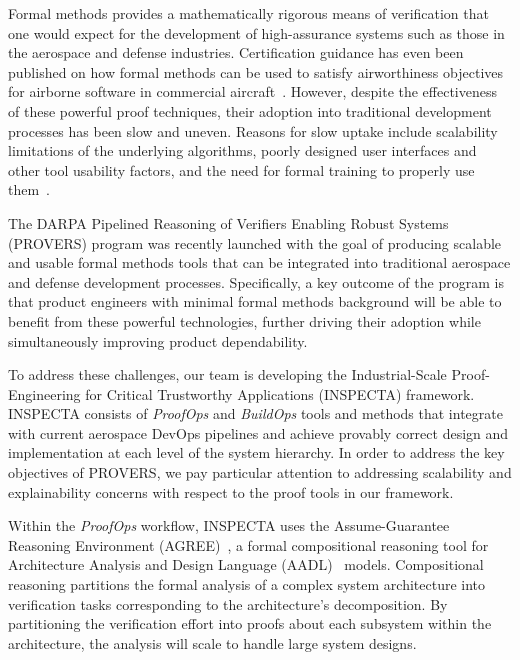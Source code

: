Formal methods provides a mathematically rigorous means of verification that one would expect for the development of high-assurance systems such as those in the aerospace and defense industries. Certification guidance has even been published on how formal methods can be used to satisfy airworthiness objectives for airborne software in commercial aircraft~\cite{DO-333}.  However, despite the effectiveness of these powerful proof techniques, their adoption into traditional development processes has been slow and uneven.  Reasons for slow uptake include scalability limitations of the underlying algorithms, poorly designed user interfaces and other tool usability factors, and the need for formal training to properly use them~\cite{davis-fmics13}.

The DARPA Pipelined Reasoning of Verifiers Enabling Robust Systems (PROVERS) program was recently launched with the goal of producing scalable and usable formal methods tools that can be integrated into traditional aerospace and defense development processes.  Specifically, a key outcome of the program is that product engineers with minimal formal methods background will be able to benefit from these powerful technologies, further driving their adoption while simultaneously improving product dependability.

To address these challenges, our team is developing the Industrial-Scale Proof-Engineering for Critical Trustworthy Applications (INSPECTA) framework.  INSPECTA consists of \textit{ProofOps} and \textit{BuildOps} tools and methods that integrate with current aerospace DevOps pipelines and achieve provably correct design and implementation at each level of the system hierarchy.  In order to address the key objectives of PROVERS, we pay particular attention to addressing scalability and explainability concerns with respect to the proof tools in our framework.

Within the \textit{ProofOps} workflow, INSPECTA uses the Assume-Guarantee Reasoning Environment (AGREE)~\cite{compositional-analysis-agree}, a formal compositional reasoning tool for Architecture Analysis and Design Language (AADL)~\cite{feiler-aadl} models.
Compositional reasoning partitions the formal analysis of a complex system architecture into verification tasks corresponding to the architecture's decomposition.  By partitioning the verification effort into proofs about each subsystem within the architecture, the analysis will scale to handle large system designs.

